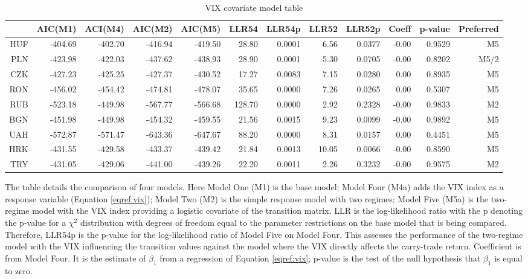 \documentclass[12pt, a4paper, oneside]{article}\usepackage[]{graphicx}\usepackage[]{color}
\begin{document}
\begin{sidewaystable}[p]
\begin{threeparttable}
\centering
\begin{tabular}{rrrrrrrrrrrr}
  \hline
 & AIC(M1) & ACI(M4) & AIC(M2) & AIC(M5) & LLR54 & LLR54p & LLR52 & LLR52p & Coeff & p-value & Preferred\\ 
  \hline
HUF & -404.69 & -402.70 & -416.94 & -419.50 & 28.80 & 0.0001 & 6.56 & 0.0377 & -0.00 & 0.9529 & M5\\ 
  PLN & -423.98 & -422.03 & -437.62 & -438.93 & 28.90 & 0.0001 & 5.30 & 0.0705 & -0.00 & 0.8202 & M5/2\\ 
  CZK & -427.23 & -425.25 & -427.37 & -430.52 & 17.27 & 0.0083 & 7.15 & 0.0280 & 0.00 & 0.8935 & M5\\ 
  RON & -456.02 & -454.42 & -474.81 & -478.07 & 35.65 & 0.0000 & 7.26 & 0.0265 & 0.00 & 0.5307 & M5\\ 
  RUB & -523.18 & -449.98 & -567.77 & -566.68 & 128.70 & 0.0000 & 2.92 & 0.2328 & -0.00 & 0.9833 & M2\\ 
  BGN & -451.98 & -449.98 & -454.32 & -459.55 & 21.56 & 0.0015 & 9.23 & 0.0099 & -0.00 & 0.9892 & M5\\ 
  UAH & -572.87 & -571.47 & -643.36 & -647.67 & 88.20 & 0.0000 & 8.31 & 0.0157 & 0.00 & 0.4451 & M5\\ 
  HRK & -431.55 & -429.58 & -433.37 & -439.42 & 21.84 & 0.0013 & 10.05 & 0.0066 & -0.00 & 0.8590 & M5\\ 
  TRY & -431.05 & -429.06 & -441.00 & -439.26 & 22.20 & 0.0011 & 2.26 & 0.3232 & -0.00 & 0.9575 & M2\\ 
   \hline
\end{tabular}
\begin{tablenotes}
\small
\item The table details the comparison of four models. Here Model  One (M1) is the base model; Model Four (M4a) adds the VIX index as a response variable (Equation \ref{eqref:vix}); Model Two (M2) is the simple response model with two regimes; Model Five (M5a) is the two-regime model with the VIX index providing a logistic covariate of the transition matrix. LLR is the log-likelihood ratio with the p denoting the p-value for a $\chi^2$ distribution with degrees of freedom equal to the parameter restrictions on the base model that is being compared.  Therefore, LLR54p is the p-value for the log-likelihood ratio of Model Five on Model Four.  This assesses the performance of the two-regime model with the VIX influencing the transition values against the model where the VIX directly affects the carry-trade return. Coefficient is from Model Four.  It is the estimate of $\beta_1$ from a regression of Equation \ref{eqref:vix}; p-value is the test of the null hypothesis that $\beta_1$ is equal to zero. 
\end{tablenotes}
\caption{VIX covariate model table}
\label{tabref:vixcov}
\end{threeparttable}
\end{sidewaystable}
\end{document}
